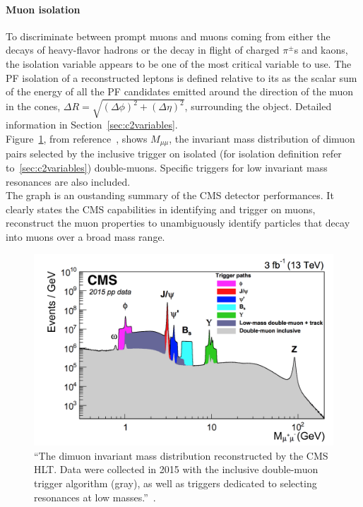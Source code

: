\paragraph{Muon isolation}\label{sec:muoniso}
To discriminate between prompt muons and muons coming from either the decays
of heavy-flavor hadrons or the decay in flight of charged $\pi^{\pm}$s and kaons, the isolation variable appears to be one of
the most critical variable to use. The PF isolation of a reconstructed
leptons is defined relative to its \pt as the scalar
sum of the energy of all the PF candidates emitted around the
direction of the muon in the cones, $\Delta R = \sqrt{(\Delta
  \phi)^2+(\Delta \eta)^2}$, surrounding the object. Detailed
information in Section~\ref{sec:c2variables}.\\


Figure~\ref{fig:dimuon}, from reference~\cite{Sirunyan_2018_muon}, shows $M_{\mu \mu}$, the invariant mass distribution of dimuon pairs selected by
the inclusive trigger on isolated (for isolation definition refer
to~\ref{sec:c2variables}) double-muons. Specific triggers for low
invariant mass resonances are also included.\\
The graph is an
oustanding summary of the CMS detector performances. It clearly states
the CMS capabilities in identifying and trigger on
muons, reconstruct the muon properties to unambiguously
identify particles that decay into muons over a broad mass range.

 \begin{figure}[h]
\centering
\includegraphics[clip,trim=1.2cm 0.1cm 0.5cm 0.3cm, width=.68\textwidth]{Figures/c2/dimuon}
\caption{``The dimuon invariant mass distribution reconstructed by the CMS HLT. Data were
collected in 2015 with the inclusive double-muon trigger algorithm (gray), as well as triggers
dedicated to selecting resonances at low masses.''~\cite{Sirunyan_2018_muon}.}
\label{fig:dimuon}
\end{figure}

